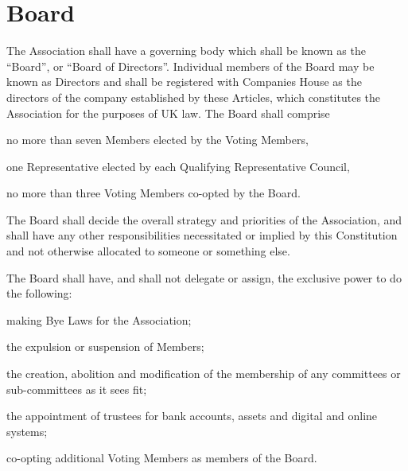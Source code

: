 \documentclass[10pt]{mk-articles-of-association}
\newcommand{\EC}[0]{Board}
\newcommand{\Exec}[0]{\EC{} }
\begin{document}
\section{\Exec}
  \begin{constenum}

  \item The Association shall have a governing body which shall be
    known as the ``\EC{}'', or ``Board of Directors''. Individual
    members of the \Exec may be known as Directors and shall be
    registered with Companies House as the directors of the company
    established by these Articles, which constitutes the Association
    for the purposes of UK law. The \Exec shall comprise
    \begin{constenum}
      \item no more than seven Members elected by the Voting
        Members, \label{ordinaryboard}
      \item one Representative elected by each Qualifying
        Representative Council, \ITand \label{boardreps}
      \item no more than three Voting Members co-opted by the
        \EC{}. \label{cooptedboard}
    \end{constenum}

  \item The \Exec shall decide the overall strategy and priorities of
    the Association, and shall have any other responsibilities
    necessitated or implied by this Constitution and not otherwise
    allocated to someone or something else.

  \item The \Exec shall have, and
    shall not delegate or assign, the exclusive power to do the
    following:\label{nondelegation}

    \begin{constenum}
      \item making Bye Laws for the Association;

      \item the expulsion or suspension of Members;

      \item the creation, abolition and modification of the membership of
        any committees or sub-committees as it sees fit;

      \item the appointment of trustees for bank accounts, assets and
        digital and online systems; \ITand

      \item co-opting additional Voting Members as members of the \EC{}.


\end{constenum}
\end{constenum}
\end{document}
